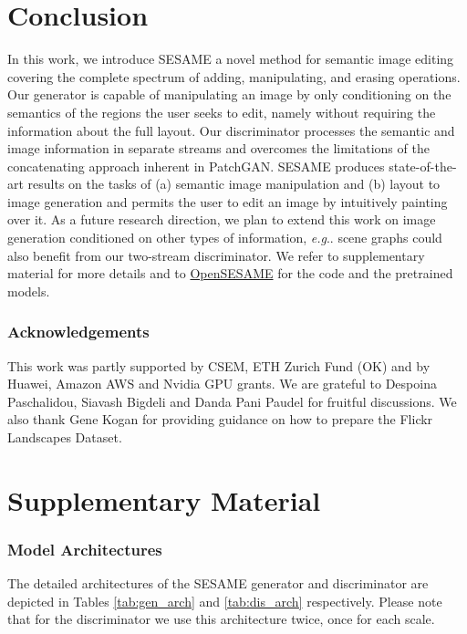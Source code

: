 \documentclass[runningheads]{llncs}
\makeatletter
\DeclareRobustCommand\onedot{\futurelet\@let@token\@onedot}
\def\@onedot{\ifx\@let@token.\else.\null\fi\xspace}
\def\eg{\emph{e.g}\onedot} \def\Eg{\emph{E.g}\onedot}
\makeatother
\begin{document}
\section{Conclusion}
\label{sec:conclusion}
In this work, we introduce SESAME a novel method for semantic image editing covering the complete spectrum of adding, manipulating, and erasing operations. 
Our generator is capable of manipulating an image by only conditioning on the semantics of the regions the user seeks to edit, namely without requiring the information about the full layout.
Our discriminator processes the semantic and image information in separate streams and overcomes the limitations of the concatenating approach inherent in PatchGAN.
SESAME produces state-of-the-art results on the tasks of (a) semantic image manipulation and (b) layout to image generation and permits the user to edit an image by intuitively painting over it. 
As a future research direction, we plan to extend this work on image generation conditioned on other types of information, \eg{} scene graphs could also benefit from our two-stream discriminator.
We refer to supplementary material for more details and to \href{https://github.com/vglsd/OpenSESAME}{OpenSESAME} for the code and the pretrained models.

\subsubsection{Acknowledgements} 
This work was partly supported by CSEM, ETH Zurich Fund (OK) and by Huawei, Amazon AWS and Nvidia GPU grants. 
We are grateful to Despoina Paschalidou, Siavash Bigdeli and Danda Pani Paudel for fruitful discussions. We also thank Gene Kogan for providing guidance on how to prepare the Flickr Landscapes Dataset. 




\clearpage
\appendix
\section{Supplementary Material}
\subsubsection{Model Architectures}
The detailed architectures of the SESAME generator and discriminator are depicted in Tables \ref{tab:gen_arch} and \ref{tab:dis_arch} respectively. Please note that for the discriminator we use this architecture twice, once for each scale.
\end{document}
